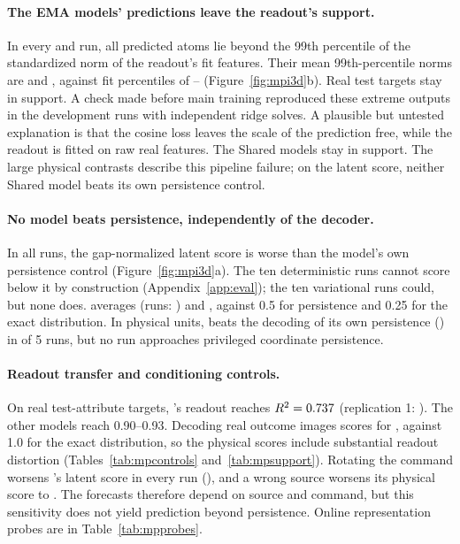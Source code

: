 \paragraph{The EMA models' predictions leave the readout's support.} In every \emadet{} and \emavar{} run, all predicted atoms lie beyond the 99th percentile of the standardized norm of the readout's fit features. Their mean 99th-percentile norms are \VMPRZeroPredNorm{} and \VMPROnePredNorm, against fit percentiles of \VMPFitNormLo--\VMPFitNormHi{} (Figure~\ref{fig:mpi3d}b). Real test targets stay in support. A check made before main training reproduced these extreme outputs in the development runs with independent ridge solves. A plausible but untested explanation is that the cosine loss leaves the scale of the prediction free, while the readout is fitted on raw real features. The Shared models stay in support. The large physical contrasts describe this pipeline failure; on the latent score, neither Shared model beats its own persistence control.

\paragraph{No model beats persistence, independently of the decoder.} In all \VMPLoseToPersistence{} runs, the gap-normalized latent score is worse than the model's own persistence control (Figure~\ref{fig:mpi3d}a). The ten deterministic runs cannot score below it by construction (Appendix~\ref{app:eval}); the ten variational runs could, but none does. \shvar{} averages \VMPSOneLatentES{} (runs: \VMPSOneLatentESList) and \shdet{} \VMPSZeroLatentES, against 0.5 for persistence and 0.25 for the exact distribution. In physical units, \shvar{} beats the decoding of its own persistence (\VMPSOnePhysPersist) in \VMPSOneBeatsOwnPhysPersist{} of 5 runs, but no run approaches privileged coordinate persistence.

\paragraph{Readout transfer and conditioning controls.} On real test-attribute targets, \shvar{}'s readout reaches $R^2=0.737$ (replication 1: \VMPSOneReadoutTestRtwoWeak). The other models reach 0.90--0.93. Decoding real outcome images scores \VMPSOneOracleED{} for \shvar{}, against 1.0 for the exact distribution, so the physical scores include substantial readout distortion (Tables~\ref{tab:mpcontrols} and~\ref{tab:mpsupport}). Rotating the command worsens \shvar{}'s latent score in every run (\VMPSOneLatentWrongAction), and a wrong source worsens its physical score to \VMPSOneWrongSource. The forecasts therefore depend on source and command, but this sensitivity does not yield prediction beyond persistence. Online representation probes are in Table~\ref{tab:mpprobes}.

